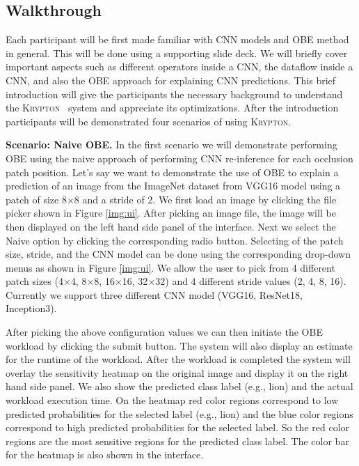 \documentclass{vldb}
\newcommand{\system}{\textsc{Krypton}}
\begin{document}
\subsection{Walkthrough}
Each participant will be first made familiar with CNN models and OBE method in general.
This will be done using a supporting slide deck.
We will briefly cover important aspects such as different operators inside a CNN, the dataflow inside a CNN, and also the OBE approach for explaining CNN predictions.
This brief introduction will give the participants the necessary background to understand the \system~ system and appreciate its optimizations.
After the introduction participants will be demonstrated four scenarios of using \system.

\vspace{2mm}
\noindent \textbf{Scenario: Naive OBE.} In the first scenario we will demonstrate performing OBE using the naive approach of performing CNN re-inference for each occlusion patch position.
Let's say we want to demonstrate the use of OBE to explain a prediction of an image from the ImageNet dataset from VGG16 model using a patch of size 8$\times$8 and a stride of 2.
We first load an image by clicking the file picker shown in Figure \ref{img:ui}.
After picking an image file, the image will be then displayed on the left hand side panel of the interface.
Next we select the Naive option by clicking the corresponding radio button.
Selecting of the patch size, stride, and the CNN model can be done using the corresponding drop-down menus as shown in Figure \ref{img:ui}.
We allow the user to pick from 4 different patch sizes (4$\times$4, 8$\times$8, 16$\times$16, 32$\times$32) and 4 different stride values (2, 4, 8, 16).
Currently we support three different CNN model (VGG16, ResNet18, Inception3).

After picking the above configuration values we can then initiate the OBE workload by clicking the submit button.
The system will also display an estimate for the runtime of the workload.
After the workload is completed the system will overlay the sensitivity heatmap on the original image and display it on the right hand side panel.
We also show the predicted class label (e.g., lion) and the actual workload execution time.
On the heatmap red color regions correspond to low predicted probabilities for the selected label (e.g., lion) and the blue color regions correspond to high predicted probabilities for the selected label. So the red color regions are the most sensitive regions for the predicted class label.
The color bar for the heatmap is also shown in the interface.
\end{document}
